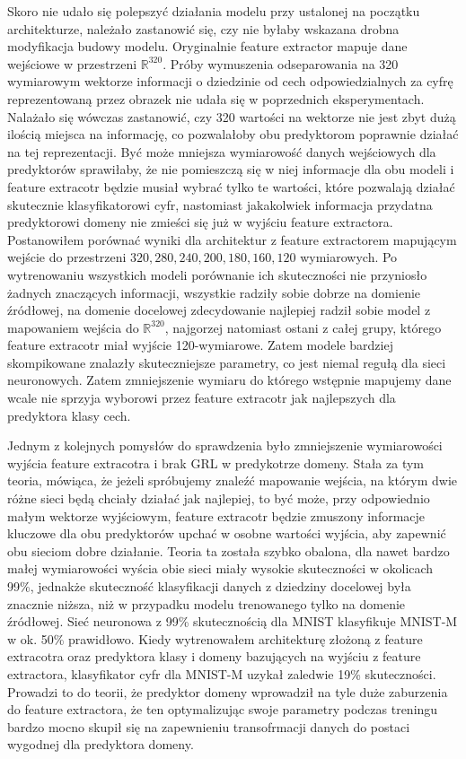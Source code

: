 \documentclass{article}
\begin{document}
Skoro nie udało się polepszyć działania modelu przy ustalonej na początku architekturze, należało zastanowić się, czy nie byłaby wskazana drobna modyfikacja budowy modelu. Oryginalnie feature extractor mapuje dane wejściowe w przestrzeni $ \mathbb{R}^{320} $. Próby wymuszenia odseparowania na 320 wymiarowym wektorze informacji o dziedzinie od cech odpowiedzialnych za cyfrę reprezentowaną przez obrazek nie udała się w poprzednich eksperymentach. Nalażało się wówczas zastanowić, czy 320 wartości na wektorze nie jest zbyt dużą ilością miejsca na informację, co pozwalałoby obu predyktorom poprawnie działać na tej reprezentacji. Być może mniejsza wymiarowość danych wejściowych dla predyktorów sprawiłaby, że nie pomieszczą się w niej informacje dla obu modeli i feature extracotr będzie musiał wybrać tylko te wartości, które pozwalają działać skutecznie klasyfikatorowi cyfr, nastomiast jakakolwiek informacja przydatna predyktorowi domeny nie zmieści się już w wyjściu feature extractora. Postanowiłem porównać wyniki dla architektur z feature extractorem mapującym wejście do przestrzeni ${320, 280, 240, 200, 180, 160, 120}$ wymiarowych. Po wytrenowaniu wszystkich modeli porównanie ich skuteczności nie przyniosło żadnych znaczących informacji, wszystkie radziły sobie dobrze na domienie źródłowej, na domenie docelowej zdecydowanie najlepiej radził sobie model z mapowaniem wejścia do $\mathbb{R}^{320}$, najgorzej natomiast ostani z całej grupy, którego feature extracotr miał wyjście 120-wymiarowe. Zatem modele bardziej skompikowane znalazły skuteczniejsze parametry, co jest niemal regułą dla sieci neuronowych. Zatem zmniejszenie wymiaru do którego wstępnie mapujemy dane wcale nie sprzyja wyborowi przez feature extracotr jak najlepszych dla predyktora klasy cech.
\par
Jednym z kolejnych pomysłów do sprawdzenia było zmniejszenie wymiarowości wyjścia feature extracotra i brak GRL w predykotrze domeny. Stała za tym teoria, mówiąca, że jeżeli spróbujemy znaleźć mapowanie wejścia, na którym dwie różne sieci będą chciały działać jak najlepiej, to być może, przy odpowiednio małym wektorze wyjściowym, feature extracotr będzie zmuszony informacje kluczowe dla obu predyktorów upchać w osobne wartości wyjścia, aby zapewnić obu sieciom dobre działanie. Teoria ta została szybko obalona, dla nawet bardzo małej wymiarowości wyścia obie sieci miały wysokie skuteczności w okolicach 99\%, jednakże skuteczność klasyfikacji danych z dziedziny docelowej była znacznie niższa, niż w przypadku modelu trenowanego tylko na domenie źródłowej. Sieć neuronowa z 99\% skutecznością dla MNIST klasyfikuje MNIST-M w ok. 50\% prawidłowo. Kiedy wytrenowałem architekturę złożoną z feature extracotra oraz predyktora klasy i domeny bazujących na wyjściu z feature extractora, klasyfikator cyfr dla MNIST-M uzykał zaledwie 19\% skuteczności. Prowadzi to do teorii, że predyktor domeny wprowadził na tyle duże zaburzenia do feature extractora, że ten optymalizując swoje parametry podczas treningu bardzo mocno skupił się na zapewnieniu transofrmacji danych do postaci wygodnej dla predyktora domeny.
\end{document}
